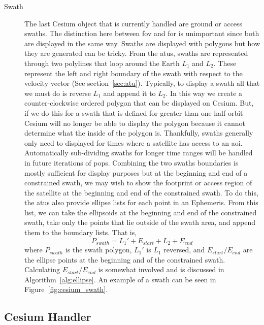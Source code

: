 \begin{description}
    \item[Swath] The last Cesium object that is currently handled are ground or
	access swaths. The distinction here between \gls{fov} and \gls{for} is
	unimportant since both are displayed in the same way. Swaths are
	displayed with polygons but how they are generated can be tricky. From
	the \glspl{atu}, swaths are represented through two polylines that loop
	around the Earth $L_1$ and $L_2$. These represent the left and right
	boundary of the swath with respect to the velocity vector (See
	section~\ref{sec:atu}).  Typically, to display a swath all that we must
	do is reverse $L_1$ and append it to $L_2$. In this way we create a
	counter-clockwise ordered polygon that can be displayed on Cesium. But,
	if we do this for a swath that is defined for greater than one
	half-orbit Cesium will no longer be able to display the polygon because
	it cannot determine what the inside of the polygon is. Thankfully,
	swaths generally only need to displayed for times where a satellite has
	access to an \gls{aoi}. Automatically sub-dividing swaths for longer
	time ranges will be handled in future iterations of \gls{pops}.
	Combining the two swaths boundaries is mostly sufficient for display
	purposes but at the beginning and end of a constrained swath, we may
	wish to show the footprint or access region of the satellite at the
	beginning and end of the constrained swath. To do this, the \glspl{atu}
	also provide ellipse lists for each point in an Ephemeris. From this
	list, we can take the ellipsoids at the beginning and end of the
	constrained swath, take only the points that lie outside of the swath
	area, and append them to the boundary lists. That is,
	\begin{equation*} 
	    P_{swath} = L_1' + E_{start} + L_2 + E_{end}
	\end{equation*} where $P_{swath}$ is the swath polygon, $L_1'$ is $L_1$
	reversed, and $E_{start}/E_{end}$ are the ellipse points at the
	beginning and of the constrained swath. Calculating $E_{start}/E_{end}$
	is somewhat involved and is discussed in Algorithm~\ref{alg:ellipse}.
	An example of a swath can be seen in Figure~\ref{fig:cesium_swath}.

\end{description}


\subsection{Cesium Handler}

